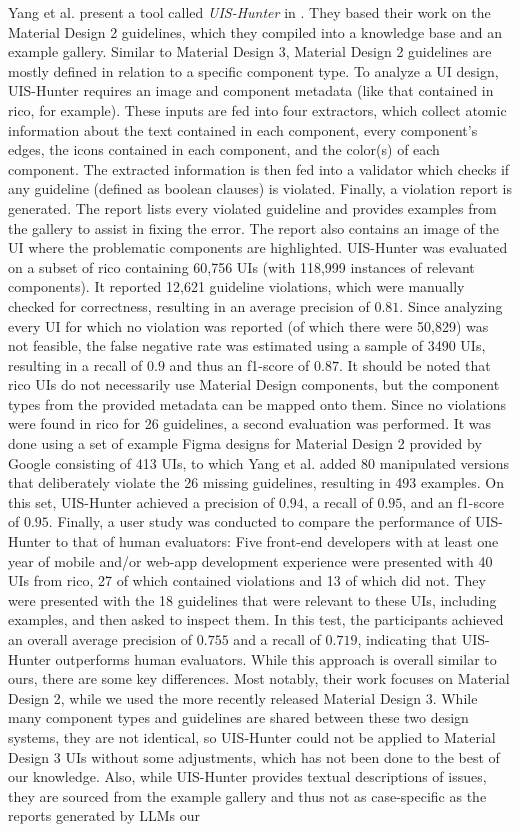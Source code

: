 \documentclass[11pt,titlepage,oneside,openany]{book}
\begin{document}
Yang et al. present a tool called \emph{UIS-Hunter} in \cite{yang_dont_2021}. They based their work on the Material Design 2 guidelines, which they compiled into a knowledge base and an example gallery. Similar to Material Design 3, Material Design 2 guidelines are mostly defined in relation to a specific component type. To analyze a UI design, UIS-Hunter requires an image and component metadata (like that contained in rico, for example). These inputs are fed into four extractors, which collect atomic information about the text contained in each component, every component's edges, the icons contained in each component, and the color(s) of each component. The extracted information is then fed into a validator which checks if any guideline (defined as boolean clauses) is violated. Finally, a violation report is generated. The report lists every violated guideline and provides examples from the gallery to assist in fixing the error. The report also contains an image of the UI where the problematic components are highlighted. UIS-Hunter was evaluated on a subset of rico containing 60,756 UIs (with 118,999 instances of relevant components). It reported 12,621 guideline violations, which were manually checked for correctness, resulting in an average precision of $0.81$. Since analyzing every UI for which no violation was reported (of which there were 50,829) was not feasible, the false negative rate was estimated using a sample of 3490 UIs, resulting in a recall of $0.9$ and thus an f1-score of $0.87$. It should be noted that rico UIs do not necessarily use Material Design components, but the component types from the provided metadata can be mapped onto them. Since no violations were found in rico for 26 guidelines, a second evaluation was performed. It was done using a set of example Figma designs for Material Design 2 provided by Google consisting of 413 UIs, to which Yang et al. added 80 manipulated versions that deliberately violate the 26 missing guidelines, resulting in 493 examples. On this set, UIS-Hunter achieved a precision of $0.94$, a recall of $0.95$, and an f1-score of $0.95$. Finally, a user study was conducted to compare the performance of UIS-Hunter to that of human evaluators: Five front-end developers with at least one year of mobile and/or web-app development experience were presented with 40 UIs from rico, 27 of which contained violations and 13 of which did not. They were presented with the 18 guidelines that were relevant to these UIs, including examples, and then asked to inspect them. In this test, the participants achieved an overall average precision of $0.755$ and a recall of $0.719$, indicating that UIS-Hunter outperforms human evaluators. While this approach is overall similar to ours, there are some key differences. Most notably, their work focuses on Material Design 2, while we used the more recently released Material Design 3. While many component types and guidelines are shared between these two design systems, they are not identical, so UIS-Hunter could not be applied to Material Design 3 UIs without some adjustments, which has not been done to the best of our knowledge. Also, while UIS-Hunter provides	 textual descriptions of issues, they are sourced from the example gallery and thus not as case-specific as the reports generated by LLMs our 
\end{document}
